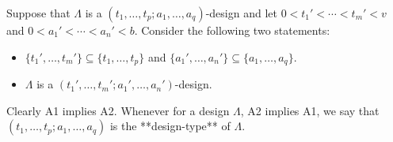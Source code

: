 Suppose that $\Lambda$ is a $(t_1, \ldots, t_p; a_1, \ldots, a_q)$-design and let $0 < t_1' < \cdots < t_m' < v$ and $0 < a_1' < \cdots < a_n' < b$. Consider the following two statements:
\begin{itemize}
\item[A1] $\{t_1', \ldots, t_m'\} \subseteq \{t_1, \ldots, t_p\}$ and $\{a_1', \ldots, a_n'\} \subseteq \{a_1, \ldots, a_q\}$.
\item[A2] $\Lambda$ is a $(t_1', \ldots, t_m'; a_1', \ldots, a_n')$-design.
\end{itemize}
Clearly A1 implies A2. Whenever for a design $\Lambda$, A2 implies A1, we say that $(t_1, \ldots, t_p; a_1, \ldots, a_q)$ is the **design-type** of $\Lambda$.
